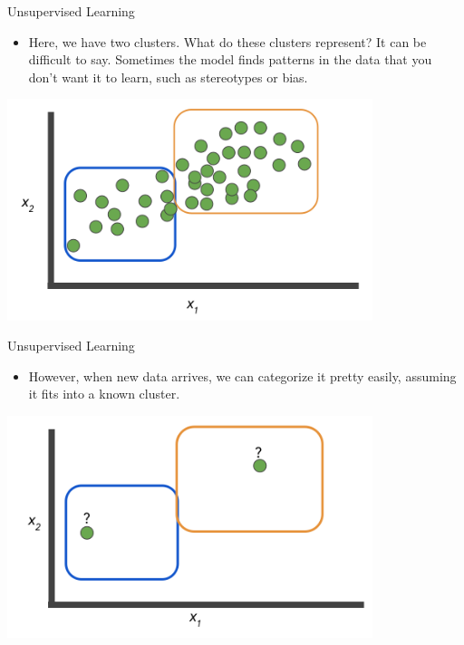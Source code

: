 \documentclass{beamer}
\begin{document}

\begin{frame}{Unsupervised Learning}

\begin{itemize}
\item Here, we have two clusters. What do these clusters represent? It can be difficult to say. Sometimes the model finds patterns in the data that you don't want it to learn, such as stereotypes or bias.

\end{itemize}

\includegraphics[width=0.8\textwidth]{images/Graph6.png}

\end{frame}


\begin{frame}{Unsupervised Learning}

\begin{itemize}
\item However, when new data arrives, we can categorize it pretty easily, assuming it fits into a known cluster. 

\end{itemize}

\includegraphics[width=0.8\textwidth]{images/Graph7.png}

\end{frame}
\end{document}
